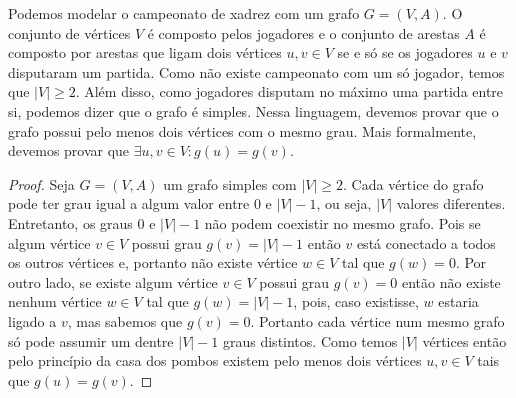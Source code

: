 \documentclass[11pt,a4paper,notitlepage]{exam}
\begin{document}
Podemos modelar o campeonato de xadrez com um grafo $G = (V, A)$. O conjunto de vértices $V$ é composto pelos jogadores e o conjunto de arestas $A$ é composto por arestas que ligam dois vértices $u, v \in V$ se e só se os jogadores $u$ e $v$ disputaram um partida. Como não existe campeonato com um só jogador, temos que $|V| \geq 2$. Além disso, como jogadores disputam no máximo uma partida entre si, podemos dizer que o grafo é simples. Nessa linguagem, devemos provar que o grafo possui pelo menos dois vértices com o mesmo grau. Mais formalmente, devemos provar que $\exists u, v \in V : g(u) = g(v)$.
\begin{proof}
  Seja $G = (V, A)$ um grafo simples com $|V| \geq 2$. Cada vértice do grafo pode ter grau igual a algum valor entre $0$ e $|V|-1$, ou seja, $|V|$ valores diferentes. Entretanto, os graus $0$ e $|V|-1$ não podem coexistir no mesmo grafo. Pois se algum vértice $v \in V$ possui grau $g(v) = |V| - 1$ então $v$ está conectado a todos os outros vértices e, portanto não existe vértice $w \in V$ tal que $g(w) = 0$. Por outro lado, se existe algum vértice $v \in V$ possui grau $g(v) = 0$ então não existe nenhum vértice $w \in V$ tal que $g(w) = |V|-1$, pois, caso existisse, $w$ estaria ligado a $v$, mas sabemos que $g(v) = 0$. Portanto cada vértice num mesmo grafo só pode assumir um dentre $|V|-1$ graus distintos. Como temos $|V|$ vértices então pelo princípio da casa dos pombos existem pelo menos dois vértices $u, v \in V$ tais que $g(u) = g(v)$.
\end{proof}
\end{document}
